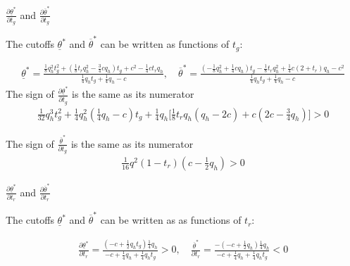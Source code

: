 \documentclass[9pt,aspectratio=1610]{beamer}
\begin{document}
\begin{frame}{$\frac{\partial\underline{\theta}^*}{\partial t_g}$ and $\frac{\partial\overline{\theta}^*}{\partial t_g}$}\label{partial_tg}

The cutoffs $\underline{\theta}^*$ and $\overline{\theta}^*$ can be written as functions of $t_g$:

\begin{align*}
    \underline{\theta}^* = \frac{\frac{1}{8}q_h^2t_g^2 + (\frac{1}{8}t_rq_h^2 - \frac{3}{4}cq_h)t_g +c^2 - \frac{1}{4}ct_rq_h}{\frac{1}{4}q_ht_g + \frac{1}{4}q_h-c},\quad \overline{\theta}^* = \frac{(-\frac{1}{8}q_h^2+\frac{1}{4}cq_h)t_g -\frac{1}{8}t_rq_h^2+\frac{1}{4}c(2+t_r)q_h-c^2}{\frac{1}{4}q_ht_g + \frac{1}{4}q_h-c}
\end{align*}
The sign of $\frac{\partial \underline{\theta}^*}{\partial t_g}$ is the same as its numerator
\begin{align*}
    \frac{1}{32}q_h^3t_g^2 + \frac{1}{4}q_h^2(\frac{1}{4}q_h-c)t_g + \frac{1}{4}q_h\big[\frac{1}{8}t_rq_h(q_h-2c) + c(2c-\frac{3}{4}q_h)\big]>0
\end{align*}

\vspace{.5em}
\hyperlink{proof_partial_tg}{}
\vspace{1em}

The sign of $\frac{\overline{\theta}^*}{\partial t_g}$ is the same as its numerator
\begin{align*}
    \frac{1}{16}q^2(1-t_r)(c-\frac{1}{2}q_h)>0
\end{align*}
\end{frame}


\begin{frame}{$\frac{\partial\underline{\theta}^*}{\partial t_r}$ and $\frac{\partial\overline{\theta}^*}{\partial t_r}$}

The cutoffs $\underline{\theta}^*$ and $\overline{\theta}^*$ can be written as as functions of $t_r$:

\begin{align*}
    \frac{\partial \underline{\theta}^*}{\partial t_r} = \frac{(-c+\frac{1}{2}q_ht_g)\frac{1}{4}q_h}{-c+\frac{1}{4}q_h + \frac{1}{4}q_ht_g}>0,\quad \frac{\overline{\theta}^*}{\partial t_r} = \frac{-(-c+\frac{1}{2}q_h)\frac{1}{4}q_h}{-c+\frac{1}{4}q_h+\frac{1}{4}q_ht_g}<0
\end{align*}
\end{frame}
\end{document}
